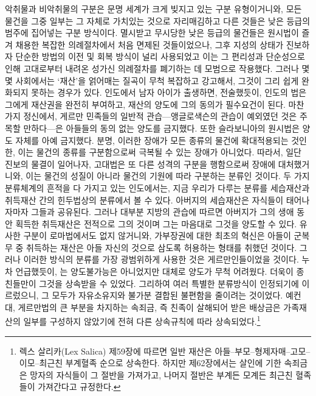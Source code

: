 악취물과 비악취물의 구분은 문명 세계가 크게 빚지고 있는 구분 유형이거니와,
모든 물건을 그중 일부는 그 자체로 가치있는 것으로 자리매김하고
다른 것들은 낮은 등급의 범주에 집어넣는 구분 방식이다.
멸시받고 무시당한
낮은 등급의 물건들은
원시법이 즐겨 채용한 복잡한 의례절차에서 처음 면제된 것들이었으나,
그후 지성의 상태가 진보하자
단순한 방법의 이전 및 회복 방식이 널리 사용되었고 이는
그 편리성과 단순성으로 인해
고대로부터 내려온 성가신 의례절차를 폐기하는 데 모범으로 작용했다.
그러나 몇몇 사회에서는
`재산'을 얽어매는 질곡이 무척 복잡하고 강고해서,
그것이 그리 쉽게 완화되지 못하는 경우가 있다.
인도에서 남자 아이가 출생하면,
전술했듯이,
인도의 법은 그에게 재산권을 완전히 부여하고,
재산의 양도에 그의 동의가 필수요건이 된다.
마찬가지 정신에서,
게르만 민족들의 일반적 관습---앵글로색슨의 관습이 예외였던 것은
주목할 만하다---은
아들들의 동의 없는 양도를 금지했다.
또한 슬라보니아의 원시법은 양도 자체를 아예 금지했다.
분명, 이러한 장애가
모든 종류의 물건에 확대적용되는 것인 한, 이는
물건의 종류를 구분함으로써 극복될 수 있는 장애가 아니었다.
따라서, 일단 진보의 물결이 일어나자,
고대법은 또 다른 성격의 구분을 행함으로써 장애에 대처했거니와,
이는 물건의 성질이 아니라 물건의 기원에 따라 구분하는 분류인 것이다.
두 가지 분류체계의 흔적을 다 가지고 있는
인도에서는, 지금 우리가 다루는 분류를
세습재산과
취득재산 간의 힌두법상의 분류에서 볼 수 있다.
아버지의 세습재산은 자식들이 태어나자마자 그들과 공유된다.
그러나 대부분 지방의 관습에 따르면
아버지가 그의 생애 동안 획득한 취득재산은 전적으로 그의 것이며
그는 마음대로 그것을 양도할 수 있다.
유사한 구분이 로마법에서도 없지 않거니와,
가부장권에 대한 최초의 혁신은
아들이 군복무 중 취득하는 재산은 아들 자신의 것으로 삼도록
허용하는 형태를 취했던 것이다.
그러나 이러한 방식의 분류를 가장 광범위하게 사용한 것은
게르만인들이었을 것이다.
누차 언급했듯이,
는 양도불가능은 아니었지만
대체로 양도가 무척 어려웠다.
더욱이 종친들만이 그것을 상속받을 수 있었다.
그리하여 여러 특별한 분류방식이 인정되기에 이르렀으니,
그 모두가 자유소유지와 불가분 결합된 불편함을 줄이려는 것이었다.
예컨대,
게르만법의 큰 부분을 차지하는
속죄금, 즉
친족이 살해되어 받은 배상금은
가족재산의 일부를 구성하지 않았기에
전혀 다른 상속규칙에 따라 상속되었다.\footnote{%
  렉스 살리카(Lex Salica) 제59장에 따르면 일반 재산은
  아들--부모--형제자매--고모--이모--최근친 부계혈족 순으로 상속한다.
  하지만 제62장에서는
  살인에 기한 속죄금은 망자의 자식들이 그 절반을 가져가고,
  나머지 절반은 부계든 모계든 최근친 혈족들이 가져간다고 규정한다.  }
